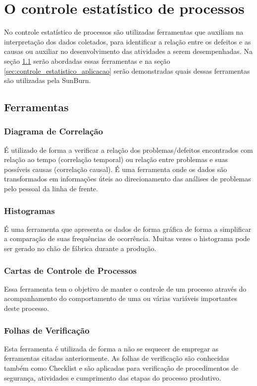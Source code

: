 \chapter{O controle estatístico de processos}
\label{chap:controle_estatistico_de_processos}
No controle estatístico de processos são utilizadas ferramentas que auxiliam na interpretação dos dados coletados, para identificar a relação entre os defeitos e as causas ou auxiliar no desenvolvimento das atividades a serem desempenhadas.  Na seção \ref{sec:controle_estatistico_sec1} serão abordadas essas ferramentas e na seção \ref{sec:controle_estatistico_aplicacao} serão demonstradas quais dessas ferramentas são utilizadas pela SunBurn.


\section{Ferramentas}
\label{sec:controle_estatistico_sec1}

\subsection{Diagrama de Correlação}
É utilizado de forma a verificar a relação dos problemas/defeitos encontrados com relação ao tempo (correlação temporal) ou relação entre problemas e suas possíveis causas (correlação causal). É uma ferramenta onde os dados são transformados em informações úteis ao direcionamento das análises de problemas pelo pessoal da linha de frente.

\subsection{Histogramas}
É uma ferramenta que apresenta os dados de forma gráfica de forma a simplificar a comparação de suas frequências de ocorrência. Muitas vezes o histograma pode ser gerado no chão de fábrica durante a produção.

\subsection{Cartas de Controle de Processos}
Essa ferramenta tem o objetivo de manter o controle de um processo através do acompanhamento do comportamento de uma ou várias variáveis importantes deste processo.

\subsection{Folhas de Verificação}
Esta ferramenta é utilizada de forma a não se esquecer de empregar as ferramentas citadas anteriormente. As folhas de verificação são conhecidas também como Checklist e são aplicadas para verificação de procedimentos de segurança, atividades e cumprimento das etapas do processo produtivo.

